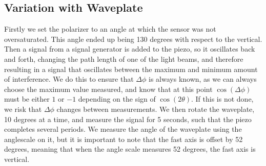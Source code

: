 \subsection{Variation with Waveplate}
Firstly we set the polarizer to an angle at which the sensor was not oversaturated. 
This angle ended up being 130 degrees with respect to the vertical.
Then a signal from a signal generator is added to the piezo, so it oscillates back and forth,
changing the path length of one of the light beams, 
and therefore resulting in a signal that oscillates between the maximum and minimum amount of interference.
We do this to ensure that $\Delta \phi$ is always known, as we can always choose the maximum value measured,
and know that at this point $\cos(\Delta \phi)$ must be either $1$ or $-1$ depending on the sign of $\cos(2\theta)$.
If this is not done, we risk that $\Delta \phi$ changes between measurements.
We then rotate the waveplate, 10 degrees at a time, and measure the signal for 5 seconds,
such that the piezo completes several periods. 
We measure the angle of the waveplate using the anglescale on it, 
but it is important to note that the fast axis is offset by 52 degrees, 
meaning that when the angle scale measures 52 degrees, the fast axis is vertical.



